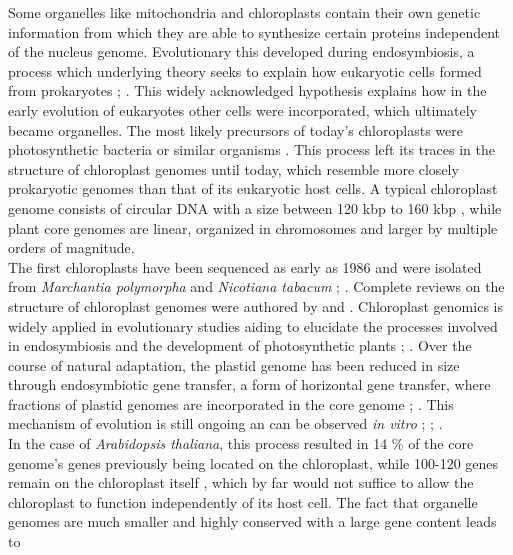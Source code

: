 Some organelles like mitochondria and chloroplasts contain their own genetic information
from which they are able to synthesize certain proteins independent of the nucleus
genome. Evolutionary this developed during endosymbiosis, a process which underlying
theory seeks to explain how eukaryotic cells formed from prokaryotes
\cite{mereschkowsky1905uber}; \cite{kutschera2005endosymbiosis}. This widely acknowledged
hypothesis explains how in the early evolution of eukaryotes other cells were
incorporated, which ultimately became organelles. The most likely precursors of today's
chloroplasts were photosynthetic bacteria or similar organisms
\cite{archibald2015endosymbiosis}. This process left its traces in the structure of
chloroplast genomes until today, which resemble more closely prokaryotic genomes than that
of its eukaryotic host cells. A typical chloroplast genome consists of circular DNA with a
size between 120 kbp to 160 kbp \cite{palmer_1985}, while plant core genomes are linear,
organized in chromosomes and larger by multiple orders of magnitude. \\
The first chloroplasts have been sequenced as early as 1986 and were isolated from
\textit{Marchantia polymorpha} and \textit{Nicotiana tabacum}
\cite{ohyama_chloroplast_1986}; \cite{shinozaki_complete_1986}. Complete reviews on the
structure of chloroplast genomes were authored by \cite{green_chloroplast_2011} and
\cite{wicke_evolution_2011}. Chloroplast genomics is widely applied in evolutionary
studies aiding to elucidate the processes involved in endosymbiosis and the development of
photosynthetic plants \cite{martin_evolutionary_2002};
\cite{xiao-ming_inferring_2017}. Over the course of natural adaptation, the plastid genome has
been reduced in size through endosymbiotic gene transfer, a form of horizontal gene
transfer, where fractions of plastid genomes are incorporated in the core genome
\cite{martin_evolutionary_2002}; \cite{deiner_environmental_2017}. This mechanism of
evolution is still ongoing an can be observed \textit{in vitro} \cite{bock2017witnessing};
\cite{fuentes2014horizontal}; \cite{stegemann2009exchange}. \\
In the case of \textit{Arabidopsis thaliana}, this process resulted in 14 \% of the core
genome's genes previously being located on the chloroplast, while 100-120 genes remain on
the chloroplast itself \cite{wicke_evolution_2011}, which by far would not suffice to
allow the chloroplast to function independently of its host cell. The fact that organelle
genomes are much smaller and highly conserved with a large gene content leads to
